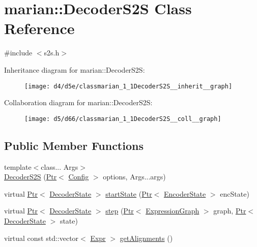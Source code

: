 \hypertarget{classmarian_1_1DecoderS2S}{}\section{marian\+:\+:Decoder\+S2S Class Reference}
\label{classmarian_1_1DecoderS2S}


{\ttfamily \#include $<$s2s.\+h$>$}



Inheritance diagram for marian\+:\+:Decoder\+S2S\+:
\nopagebreak
\begin{figure}[H]
\begin{center}
\leavevmode
\texttt{[image: d4/d5e/classmarian\_1\_1DecoderS2S\_\_inherit\_\_graph]}
\end{center}
\end{figure}


Collaboration diagram for marian\+:\+:Decoder\+S2S\+:
\nopagebreak
\begin{figure}[H]
\begin{center}
\leavevmode
\texttt{[image: d5/d66/classmarian\_1\_1DecoderS2S\_\_coll\_\_graph]}
\end{center}
\end{figure}
\subsection*{Public Member Functions}
\begin{DoxyCompactItemize}
\item 
{\footnotesize template$<$class... Args$>$ }\\\hyperlink{classmarian_1_1DecoderS2S_a2b85c8e7d064a0baa1a489ca208584d1}{Decoder\+S2S} (\hyperlink{namespacemarian_ad1a373be43a00ef9ce35666145137b08}{Ptr}$<$ \hyperlink{classmarian_1_1Config}{Config} $>$ options, Args...\+args)
\item 
virtual \hyperlink{namespacemarian_ad1a373be43a00ef9ce35666145137b08}{Ptr}$<$ \hyperlink{classmarian_1_1DecoderState}{Decoder\+State} $>$ \hyperlink{classmarian_1_1DecoderS2S_a7a96b3617137d832395542405c903b1e}{start\+State} (\hyperlink{namespacemarian_ad1a373be43a00ef9ce35666145137b08}{Ptr}$<$ \hyperlink{classmarian_1_1EncoderState}{Encoder\+State} $>$ enc\+State)
\item 
virtual \hyperlink{namespacemarian_ad1a373be43a00ef9ce35666145137b08}{Ptr}$<$ \hyperlink{classmarian_1_1DecoderState}{Decoder\+State} $>$ \hyperlink{classmarian_1_1DecoderS2S_a786a6f2e325d86a8335cc5fc25170518}{step} (\hyperlink{namespacemarian_ad1a373be43a00ef9ce35666145137b08}{Ptr}$<$ \hyperlink{classmarian_1_1ExpressionGraph}{Expression\+Graph} $>$ graph, \hyperlink{namespacemarian_ad1a373be43a00ef9ce35666145137b08}{Ptr}$<$ \hyperlink{classmarian_1_1DecoderState}{Decoder\+State} $>$ state)
\item 
virtual const std\+::vector$<$ \hyperlink{namespacemarian_a498d8baf75b754011078b890b39c8e12}{Expr} $>$ \hyperlink{classmarian_1_1DecoderS2S_a4da86da8904d9f2fb1eedf44709d225d}{get\+Alignments} ()
\end{DoxyCompactItemize}
